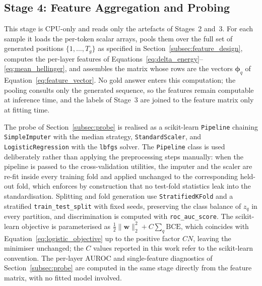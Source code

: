 \subsection{Stage 4: Feature Aggregation and Probing}
\label{subsec:stage4}

This stage is CPU-only and reads only the artefacts of Stages~2 and~3. For
each sample it loads the per-token scalar arrays, pools them over the full
set of generated positions $\{1, \ldots, T_g\}$ as specified in
Section~\ref{subsec:feature_design}, computes the per-layer features of
Equations~\eqref{eq:delta_energy}--\eqref{eq:mean_hellinger}, and assembles
the matrix whose rows are the vectors $\boldsymbol{\phi}_q$ of
Equation~\eqref{eq:feature_vector}. No gold answer enters this computation;
the pooling consults only the generated sequence, so the features remain
computable at inference time, and the labels of Stage~3 are joined to the
feature matrix only at fitting time.

The probe of Section~\ref{subsec:probe} is realised as a scikit-learn
\texttt{Pipeline} chaining \texttt{SimpleImputer} with the median strategy,
\texttt{StandardScaler}, and \texttt{LogisticRegression} with the
\texttt{lbfgs} solver. The \texttt{Pipeline} class is used deliberately
rather than applying the preprocessing steps manually: when the pipeline is
passed to the cross-validation utilities, the imputer and the scaler are
re-fit inside every training fold and applied unchanged to the
corresponding held-out fold, which enforces by construction that no
test-fold statistics leak into the standardisation. Splitting and fold
generation use \texttt{StratifiedKFold} and a stratified
\texttt{train\_test\_split} with fixed seeds, preserving the class balance
of $z_q$ in every partition, and discrimination is computed with
\texttt{roc\_auc\_score}. The scikit-learn objective is parameterised as
$\tfrac{1}{2}\|\mathbf{w}\|_2^2 + C\sum_q \mathrm{BCE}$, which coincides
with Equation~\eqref{eq:logistic_objective} up to the positive factor
$CN$, leaving the minimiser unchanged; the
$C$ values reported in this work refer to the scikit-learn convention. The
per-layer AUROC and single-feature diagnostics of
Section~\ref{subsec:probe} are computed in the same stage directly from the
feature matrix, with no fitted model involved.

